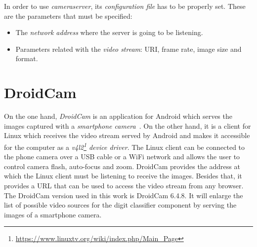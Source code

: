 In order to use \textit{cameraserver}, its \emph{configuration file} has to be properly set. These are the parameters that must be specified:
\begin{itemize}
	\item The \emph{network address} where the server is going to be listening.
	
	\item Parameters related with the \emph{video stream}: URI, frame rate, image size and format.
\end{itemize}

\section{DroidCam}\label{sec:droidcam}
On the one hand, \emph{DroidCam} is an application for Android which serves the images captured with a \emph{smartphone camera}~\cite{droidcam}. On the other hand, it is a client for Linux which receives the video stream served by Android and makes it accessible for the computer as a \emph{v4l2\footnote{\url{https://www.linuxtv.org/wiki/index.php/Main_Page}} device driver}. The Linux client can be connected to the phone camera over a USB cable or a WiFi network and allows the user to control camera flash, auto-focus and zoom. DroidCam provides the address at which the Linux client must be listening to receive the images. Besides that, it provides a URL that can be used to access the video stream from any browser. The DroidCam version used in this work is DroidCam 6.4.8. It will enlarge the list of possible video sources for the digit classifier component by serving the images of a smartphone camera.

